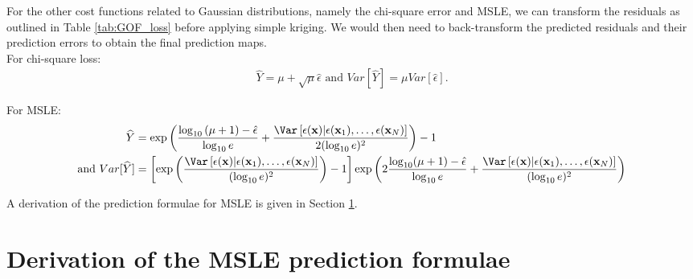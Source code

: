 For the other cost functions related to Gaussian distributions, namely the chi-square error and MSLE, we can transform the residuals as outlined in Table \ref{tab:GOF_loss} before applying simple kriging. We would then need to back-transform the predicted residuals and their prediction errors to obtain the final prediction maps. 
\\
For chi-square loss:
\begin{gather}
\widehat{Y} = \mu + \sqrt{\mu}\hat{\epsilon} \text{ and }
Var[\widehat{Y}] = \mu Var[\hat{\epsilon}]. \label{eqn:chisquarebt}
\end{gather}

For MSLE:
\begin{align}
\widehat{Y} &= \exp\left(\frac{\log_{10}\left(\mu + 1\right) - \hat{\epsilon}}{\log_{10}e} + \frac{\Var\left[\epsilon(\mathbf{x})|\epsilon(\mathbf{x}_{1}), 
    \dots, \epsilon(\mathbf{x}_{N})\right]}{2(\log_{10}e)^2}\right) - 1 \label{eqn:mslbt1} \\
\text{and } Var[\widehat{Y}] &= \left[\exp\left(\frac{\Var\left[\epsilon(\mathbf{x})|\epsilon(\mathbf{x}_{1}), 
    \dots, \epsilon(\mathbf{x}_{N})\right]}{(\log_{10}e)^2}\right) - 1\right]\exp\left(2\frac{\log_{10}(\mu + 1) - \hat{\epsilon}}{\log_{10}e} + \frac{\Var\left[\epsilon(\mathbf{x})|\epsilon(\mathbf{x}_{1}), 
    \dots, \epsilon(\mathbf{x}_{N})\right]}{(\log_{10}e)^2}\right) \label{eqn:mslbt2}
\end{align}

A derivation of the prediction formulae for MSLE is given in Section \ref{supp-c-msle}.

\section{Derivation of the MSLE prediction formulae} \label{supp-c-msle}

